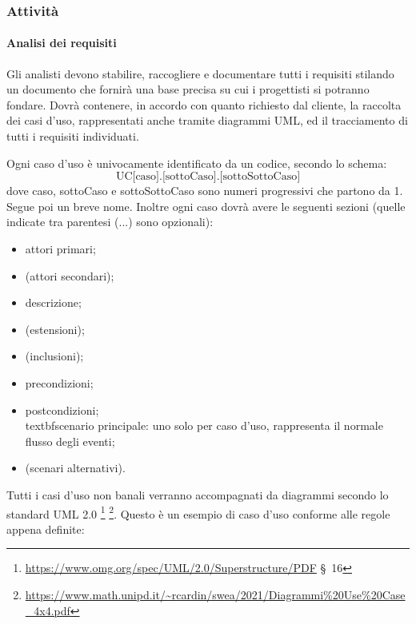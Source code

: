     \subsubsection{Attività}
        \paragraph{Analisi dei requisiti}
                Gli analisti devono stabilire, raccogliere e documentare tutti i requisiti stilando un documento che fornirà una base precisa su cui i progettisti si potranno fondare. Dovrà contenere, in accordo con quanto richiesto dal cliente, la raccolta dei casi d'uso, rappresentati anche tramite diagrammi UML, ed il tracciamento di tutti i requisiti individuati.

                Ogni caso d'uso è univocamente identificato da un codice, secondo lo schema:
                $$\text{UC[caso].[sottoCaso].[sottoSottoCaso]}$$
                dove caso, sottoCaso e sottoSottoCaso sono numeri progressivi che partono da 1. Segue poi un breve nome. Inoltre ogni caso dovrà avere le seguenti sezioni (quelle indicate tra parentesi (...) sono opzionali):
                \begin{itemize}
                    \item attori primari;
                    \item (attori secondari);
                    \item descrizione;
                    \item (estensioni);
                    \item (inclusioni);
                    \item precondizioni;
                    \item postcondizioni;
                    \\textbf{scenario principale: }uno solo per caso d'uso, rappresenta il normale flusso degli eventi;
                    \item (scenari alternativi).
                \end{itemize}

                Tutti i casi d'uso non banali verranno accompagnati da diagrammi secondo lo standard UML 2.0 \footnote{\url{https://www.omg.org/spec/UML/2.0/Superstructure/PDF} \S\ 16} \footnote{\url{https://www.math.unipd.it/~rcardin/swea/2021/Diagrammi\%20Use\%20Case_4x4.pdf}}.
                Questo è un esempio di caso d'uso conforme alle regole appena definite:

